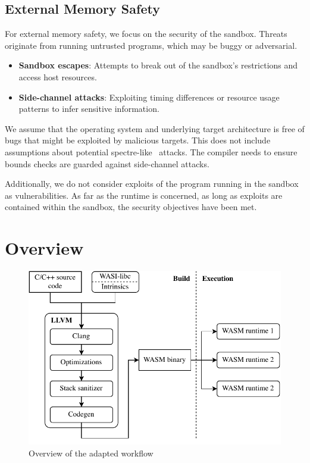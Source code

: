 \subsection{External Memory Safety}
\label{subsec:external-memory-safety}

For external memory safety, we focus on the security of the sandbox.
Threats originate from running untrusted programs, which may be buggy or adversarial.

\begin{itemize}
    \item \textbf{Sandbox escapes}: Attempts to break out of the sandbox's restrictions and access host resources.
    \item \textbf{Side-channel attacks}: Exploiting timing differences or resource usage patterns to infer sensitive information.
\end{itemize}

We assume that the operating system and underlying target architecture is free of bugs that might be exploited by malicious targets.
This does not include assumptions about potential spectre-like~\cite{kocher2020spectre} attacks.
The compiler needs to ensure bounds checks are guarded against side-channel attacks.

Additionally, we do not consider exploits of the program running in the sandbox as vulnerabilities.
As far as the runtime is concerned, as long as exploits are contained within the sandbox, the security objectives have been met.

\section{Overview}
\label{sec:overview}

\begin{figure}[t]
    \centering
    \includegraphics{figures/build/overview}
    \caption{Overview of the adapted workflow}
    \label{fig:overview}
\end{figure}

